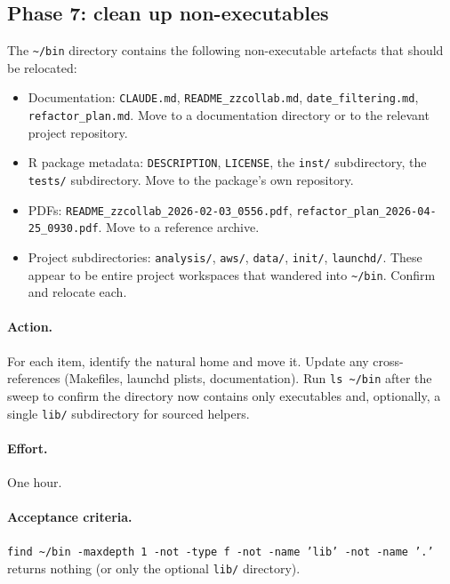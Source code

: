 \documentclass[11pt,letterpaper]{scrartcl}
\begin{document}
\subsection{Phase 7: clean up non-executables}

The \texttt{\textasciitilde/bin} directory contains the following
non-executable artefacts that should be relocated:

\begin{itemize}
  \item Documentation: \texttt{CLAUDE.md},
        \texttt{README\_zzcollab.md},
        \texttt{date\_filtering.md},
        \texttt{refactor\_plan.md}. Move to a documentation
        directory or to the relevant project repository.
  \item R package metadata: \texttt{DESCRIPTION},
        \texttt{LICENSE}, the \texttt{inst/} subdirectory, the
        \texttt{tests/} subdirectory. Move to the package's own
        repository.
  \item PDFs: \texttt{README\_zzcollab\_2026-02-03\_0556.pdf},
        \texttt{refactor\_plan\_2026-04-25\_0930.pdf}. Move to a
        reference archive.
  \item Project subdirectories: \texttt{analysis/},
        \texttt{aws/}, \texttt{data/}, \texttt{init/},
        \texttt{launchd/}. These appear to be entire project
        workspaces that wandered into \texttt{\textasciitilde/bin}.
        Confirm and relocate each.
\end{itemize}

\paragraph{Action.} For each item, identify the natural home and
move it. Update any cross-references (Makefiles, launchd plists,
documentation). Run \texttt{ls \textasciitilde/bin} after the
sweep to confirm the directory now contains only executables and,
optionally, a single \texttt{lib/} subdirectory for sourced
helpers.

\paragraph{Effort.} One hour.

\paragraph{Acceptance criteria.} \texttt{find \textasciitilde/bin
-maxdepth 1 -not -type f -not -name 'lib' -not -name '.'} returns
nothing (or only the optional \texttt{lib/} directory).
\end{document}
